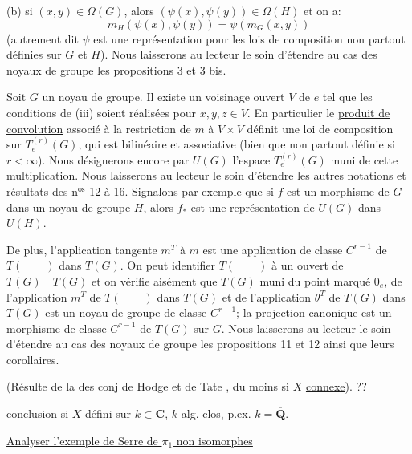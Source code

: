 (b) si $(x,y)\in\Omega(G)$, alors $(\psi(x),\psi(y))\in\Omega(H)$ et on a:
\[
m_H(\psi(x),\psi(y))=\psi(m_G(x,y))
\]
(autrement dit $\psi$ est une représentation pour les lois de composition non partout définies sur $G$ et $H$).
Nous laisserons au lecteur le soin d'étendre au cas des noyaux de groupe les propositions 3 et 3 bis.

Soit $G$ un noyau de groupe.
Il existe un voisinage ouvert $V$ de $e$ tel que les conditions de (iii) soient réalisées pour $x,y,z\in V$.
En particulier le \uline{produit de convolution} associé à la restriction de $m$ à $V\times V$ définit une loi de composition sur $T_e^{(r)}(G)$, qui est bilinéaire et associative (bien que non partout définie si $r<\infty$).
Nous désignerons encore par $U(G)$ l'espace $T_e^{(r)}(G)$ muni de cette multiplication.
Nous laisserons au lecteur le soin d'étendre les autres notations et résultats des n$^{\mathrm{os}}$ 12 à 16.
Signalons par exemple que si $f$ est un morphisme de $G$ dans un noyau de groupe $H$, alors $f_*$ est une \uline{représentation} de $U(G)$ dans $U(H)$.

De plus, l'application tangente $m^T$ à $m$ est une application de classe $C^{r-1}$ de $T(\qquad)$ dans $T(G)$.
On peut identifier $T(\qquad)$ à un ouvert de $T(G)\quad T(G)$ et on vérifie aisément que $T(G)$ muni du point marqué $0_e$, de l'application $m^T$ de $T(\qquad)$ dans $T(G)$ et de l'application $\theta^T$ de $T(G)$ dans $T(G)$ est un \uline{noyau de groupe} de classe $C^{r-1}$; la projection canonique est un morphisme de classe $C^{r-1}$ de $T(G)$ sur $G$.
Nous laisserons au lecteur le soin d'étendre au cas des noyaux de groupe les propositions 11 et 12 ainsi que leurs corollaires.

(Résulte de la  des conj de Hodge et de Tate
,
du moins si $X$ \uline{connexe}).
\uline{} ??


 conclusion si $X$ défini sur $k\subset\mathbf C$, $k$ alg. clos, p.ex. $k=\overline{\mathbf Q}$.

\uline{Analyser l'exemple de Serre de $\pi_1$ non isomorphes}

